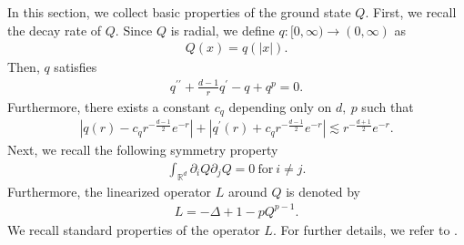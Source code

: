 \documentclass[reqno]{amsart}
\theoremstyle{plain}
\theoremstyle{definition}
\numberwithin{equation}{section}
\newcommand{\1}{\mathbbm{1}}
\begin{document}
In this section, we collect basic properties of the ground state $Q$. First, we recall the decay rate of $Q$. Since $Q$ is radial, we define $q:[0,\infty)\to (0,\infty)$ as 
\begin{align*}
Q(x)=q(|x|).
\end{align*}
Then, $q$ satisfies
\begin{align}\label{qode2}
q^{\prime \prime}+\frac{d-1}{r}q^{\prime}-q+q^p=0.
\end{align}
Furthermore, there exists a constant $c_q$ depending only on $d,\ p$ such that 
\begin{align}\label{qes}
|q(r)-c_qr^{-\frac{d-1}{2}}e^{-r}|+|q^{\prime}(r)+c_qr^{-\frac{d-1}{2}}e^{-r}|\lesssim r^{-\frac{d+1}{2}}e^{-r}.
\end{align}
Next, we recall the following symmetry property
\begin{align}\label{Qsymmetry}
\int_{\mathbb{R}^d} {\partial}_iQ{\partial}_jQ=0\ \mbox{for}\ i\neq j.
\end{align}
Furthermore, the linearized operator $L$  around $Q$ is denoted by
\begin{align}\label{Ldef}
L=-\Delta+1-pQ^{p-1}.
\end{align}
We recall standard properties of the operator $L$. For further details, we refer to \cite{CGNT}.
\end{document}
